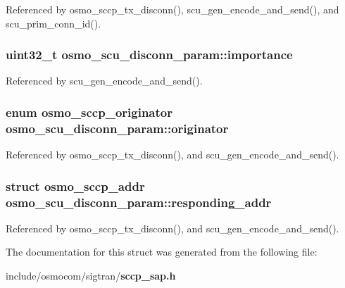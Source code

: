Referenced by osmo\+\_\+sccp\+\_\+tx\+\_\+disconn(), scu\+\_\+gen\+\_\+encode\+\_\+and\+\_\+send(), and scu\+\_\+prim\+\_\+conn\+\_\+id().

\subsubsection[{importance}]{\setlength{\rightskip}{0pt plus 5cm}uint32\+\_\+t osmo\+\_\+scu\+\_\+disconn\+\_\+param\+::importance}\label{structosmo__scu__disconn__param_a7c06c83ba961c721bba70a43339fb3c9}


Referenced by scu\+\_\+gen\+\_\+encode\+\_\+and\+\_\+send().

\subsubsection[{originator}]{\setlength{\rightskip}{0pt plus 5cm}enum {\bf osmo\+\_\+sccp\+\_\+originator} osmo\+\_\+scu\+\_\+disconn\+\_\+param\+::originator}\label{structosmo__scu__disconn__param_a376d310d66d3a6366241fa5c88ee83ce}


Referenced by osmo\+\_\+sccp\+\_\+tx\+\_\+disconn(), and scu\+\_\+gen\+\_\+encode\+\_\+and\+\_\+send().

\subsubsection[{responding\+\_\+addr}]{\setlength{\rightskip}{0pt plus 5cm}struct {\bf osmo\+\_\+sccp\+\_\+addr} osmo\+\_\+scu\+\_\+disconn\+\_\+param\+::responding\+\_\+addr}\label{structosmo__scu__disconn__param_abee9d68124404184bbaf88efc4d94174}


Referenced by osmo\+\_\+sccp\+\_\+tx\+\_\+disconn(), and scu\+\_\+gen\+\_\+encode\+\_\+and\+\_\+send().



The documentation for this struct was generated from the following file\+:\begin{DoxyCompactItemize}
\item 
include/osmocom/sigtran/{\bf sccp\+\_\+sap.\+h}\end{DoxyCompactItemize}
